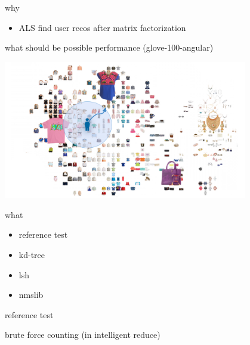 \documentclass[xcolor=dvipsnames, aspectratio=1610]{beamer}
\begin{document}
\begin{frame}{why} 
\linespread{1}\Large{
\begin{minipage}{0.99\textwidth}  
\begin{itemize}
\item ALS find user recos after matrix factorization 
\end{itemize}
\end{minipage}}
\end{frame}



\begin{frame}{what should be possible performance (glove-100-angular)} 
\linespread{1}\Large{
\begin{minipage}{0.99\textwidth}  
\includegraphics[width=0.8\textwidth]{Figures/vs.png}
\end{minipage}}
\end{frame}


  
\begin{frame}{what} 
\linespread{1}\Large{
\begin{minipage}{0.99\textwidth}  
\begin{itemize}
\item reference test
\item kd-tree
\item lsh
\item nmslib
\end{itemize}
\end{minipage}}
\end{frame}

 
 
\begin{frame}{reference test} 
\linespread{1}\Large{
\begin{minipage}{0.99\textwidth}  
brute force counting (in intelligent reduce)
\end{minipage}}
\end{frame}
\end{document}

